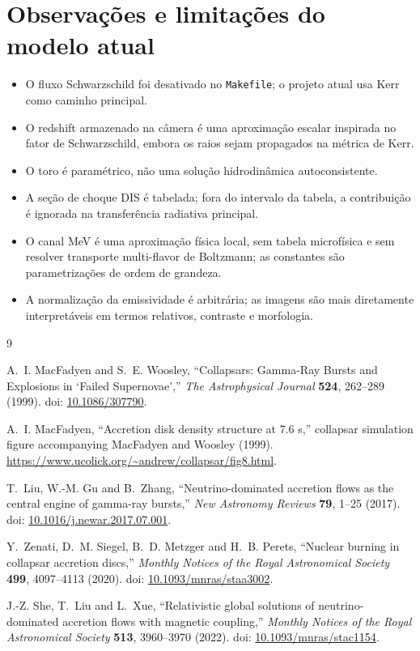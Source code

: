 \documentclass[11pt,a4paper]{article}
\begin{document}
\section{Observações e limitações do modelo atual}

\begin{itemize}
  \item O fluxo Schwarzschild foi desativado no \texttt{Makefile}; o projeto
  atual usa Kerr como caminho principal.
  \item O redshift armazenado na câmera é uma aproximação escalar inspirada
  no fator de Schwarzschild, embora os raios sejam propagados na métrica de
  Kerr.
  \item O toro é paramétrico, não uma solução hidrodinâmica autoconsistente.
  \item A seção de choque DIS é tabelada; fora do intervalo da tabela, a
  contribuição é ignorada na transferência radiativa principal.
  \item O canal MeV é uma aproximação física local, sem tabela microfísica e
  sem resolver transporte multi-flavor de Boltzmann; as constantes são
  parametrizações de ordem de grandeza.
  \item A normalização da emissividade é arbitrária; as imagens são mais
  diretamente interpretáveis em termos relativos, contraste e morfologia.
\end{itemize}

\begin{thebibliography}{9}

A.~I. MacFadyen and S.~E. Woosley,
``Collapsars: Gamma-Ray Bursts and Explosions in `Failed Supernovae',''
\emph{The Astrophysical Journal} \textbf{524}, 262--289 (1999).
doi: \href{https://doi.org/10.1086/307790}{10.1086/307790}.

A.~I. MacFadyen,
``Accretion disk density structure at 7.6 s,''
collapsar simulation figure accompanying MacFadyen and Woosley (1999).
\url{https://www.ucolick.org/~andrew/collapsar/fig8.html}.

T.~Liu, W.-M. Gu and B.~Zhang,
``Neutrino-dominated accretion flows as the central engine of gamma-ray bursts,''
\emph{New Astronomy Reviews} \textbf{79}, 1--25 (2017).
doi: \href{https://doi.org/10.1016/j.newar.2017.07.001}
{10.1016/j.newar.2017.07.001}.

Y.~Zenati, D.~M. Siegel, B.~D. Metzger and H.~B. Perets,
``Nuclear burning in collapsar accretion discs,''
\emph{Monthly Notices of the Royal Astronomical Society}
\textbf{499}, 4097--4113 (2020).
doi: \href{https://doi.org/10.1093/mnras/staa3002}
{10.1093/mnras/staa3002}.

J.-Z. She, T.~Liu and L.~Xue,
``Relativistic global solutions of neutrino-dominated accretion flows with
magnetic coupling,''
\emph{Monthly Notices of the Royal Astronomical Society}
\textbf{513}, 3960--3970 (2022).
doi: \href{https://doi.org/10.1093/mnras/stac1154}
{10.1093/mnras/stac1154}.

\end{thebibliography}
\end{document}
